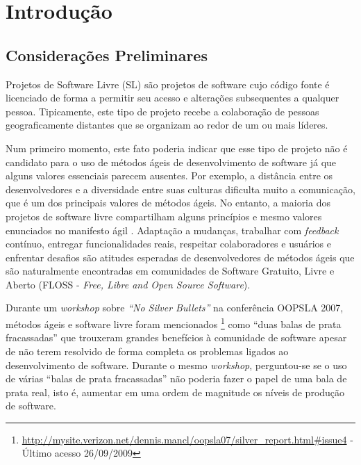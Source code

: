 \chapter{Introdução}
\label{cap:introducao}

\section{Considerações Preliminares}
\label{sec:consideracoes_preliminares}

Projetos de Software Livre (SL) são projetos de software cujo código
fonte é licenciado de forma a permitir seu acesso e alterações
subsequentes a qualquer pessoa. Tipicamente, este tipo de projeto recebe a
colaboração de pessoas geograficamente distantes \cite{Dempsey1999} que
se organizam ao redor de um ou mais líderes.

Num primeiro momento, este fato poderia indicar que esse tipo de
projeto não é candidato para o uso de métodos ágeis de desenvolvimento
de software já que alguns valores essenciais parecem ausentes. Por
exemplo, a distância entre os desenvolvedores e a diversidade entre
suas culturas dificulta muito a comunicação, que é um dos principais
valores de métodos ágeis. No entanto, a maioria dos projetos de
software livre compartilham alguns princípios e mesmo valores
enunciados no manifesto ágil \cite{AgileManifesto}. Adaptação a
mudanças, trabalhar com \emph{feedback} contínuo, entregar
funcionalidades reais, respeitar colaboradores e usuários e enfrentar
desafios são atitudes esperadas de desenvolvedores de métodos ágeis
que são naturalmente encontradas em comunidades de Software Gratuito,
Livre e Aberto (FLOSS - \emph{Free, Libre and Open Source Software}).

Durante um \emph{workshop} \cite{OOPSLA07} sobre \emph{``No Silver
  Bullets''} \cite{Brooks1987} na conferência OOPSLA 2007, métodos
ágeis e software livre foram mencionados
\footnote{\url{http://mysite.verizon.net/dennis.mancl/oopsla07/silver_report.html\#issue4}
  - Último acesso 26/09/2009} como ``duas balas de prata fracassadas''
que trouxeram grandes benefícios à comunidade de software apesar de
não terem resolvido de forma completa os problemas ligados ao
desenvolvimento de software. Durante o mesmo \emph{workshop},
perguntou-se se o uso de várias ``balas de prata fracassadas'' não
poderia fazer o papel de uma bala de prata real, isto é, aumentar em
uma ordem de magnitude os níveis de produção de software.

